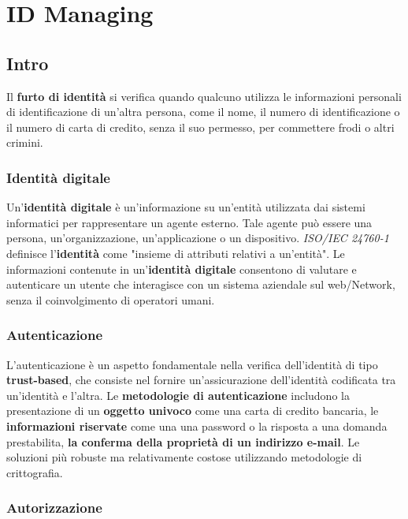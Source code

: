 \chapter{ID Managing}

\section{Intro}

Il \textbf{furto di identità} si verifica quando qualcuno utilizza le informazioni
personali di identificazione di un'altra persona, come il nome, il numero di
identificazione o il numero di carta di credito, senza il suo permesso,
per commettere frodi o altri crimini.

\subsection{Identità digitale}

Un'\textbf{identità digitale} è un'informazione su un'entità utilizzata dai sistemi
informatici per rappresentare un agente esterno.
Tale agente può essere una persona, un'organizzazione, un'applicazione o un
dispositivo.
\textit{ISO/IEC 24760-1} definisce l'\textbf{identità} come
"insieme di attributi relativi a un'entità".
Le informazioni contenute in un'\textbf{identità digitale} consentono di valutare
e autenticare un utente che interagisce con un sistema aziendale sul web/Network,
senza il coinvolgimento di operatori umani.

\subsection{Autenticazione}

L'autenticazione è un aspetto fondamentale nella verifica dell'identità
di tipo \textbf{trust-based}, che consiste nel fornire un'assicurazione
dell'identità codificata tra un'identità e l'altra.
Le \textbf{metodologie di autenticazione} includono la presentazione di
un \textbf{oggetto univoco} come una carta di credito bancaria,
le \textbf{informazioni riservate} come una una password o la risposta a una
domanda prestabilita, \textbf{la conferma della proprietà di un indirizzo e-mail}.
Le soluzioni più robuste ma relativamente costose utilizzando metodologie di
crittografia.

\subsection{Autorizzazione}

